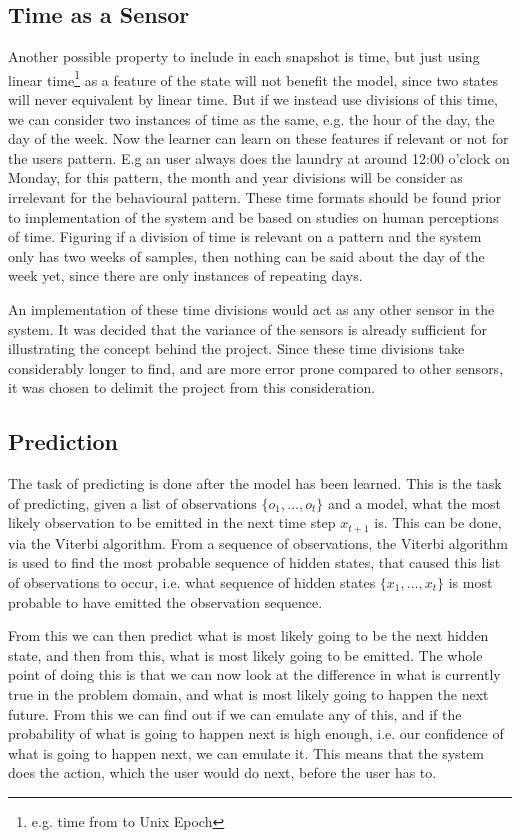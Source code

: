 \subsection{Time as a Sensor}
Another possible property to include in each snapshot is time, but just using linear time\footnote{e.g. time from to Unix Epoch\cite{unix_epoch}} as a feature of the state will not benefit the model, since two states will never equivalent by linear time. But if we instead use divisions of this time, we can consider two instances of time as the same, e.g. the hour of the day, the day of the week. Now the learner can learn on these features if relevant or not for the users pattern. E.g an user always does the laundry at around 12:00 o'clock on Monday, for this pattern, the month and year divisions will be consider as irrelevant for the behavioural pattern. These time formats should be found prior to implementation of the system and be based on studies on human perceptions of time. Figuring if a division of time is relevant on a pattern and the system only has two weeks of samples, then nothing can be said about the day of the week yet, since there are only instances of repeating days.

An implementation of these time divisions would act as any other sensor in the system. It was decided that the variance of the sensors is already sufficient for illustrating the concept behind the project. Since these time divisions take considerably longer to find, and are more error prone compared to other sensors, it was chosen to delimit the project from this consideration.

\subsection{Prediction}\label{sub:Prediction}
The task of predicting is done after the model has been learned. This is the task of predicting, given a list of observations $\{o_1,\dots,o_t\}$ and a model, what the most likely observation to be emitted in the next time step $x_{t+1}$ is. This can be done, via the Viterbi algorithm\cite{russell2010artificial}. From a sequence of observations, the Viterbi algorithm is used to find the most probable sequence of hidden states, that caused this list of observations to occur, i.e. what sequence of hidden states $\{x_1,\dots,x_t\}$ is most probable to have emitted the observation sequence.

From this we can then predict what is most likely going to be the next hidden state, and then from this, what is most likely going to be emitted. The whole point of doing this is that we can now look at the difference in what is currently true in the problem domain, and what is most likely going to happen the next future. From this we can find out if we can emulate any of this, and if the probability of what is going to happen next is high enough, i.e. our confidence of what is going to happen next, we can emulate it. This means that the system does the action, which the user would do next, before the user has to.

